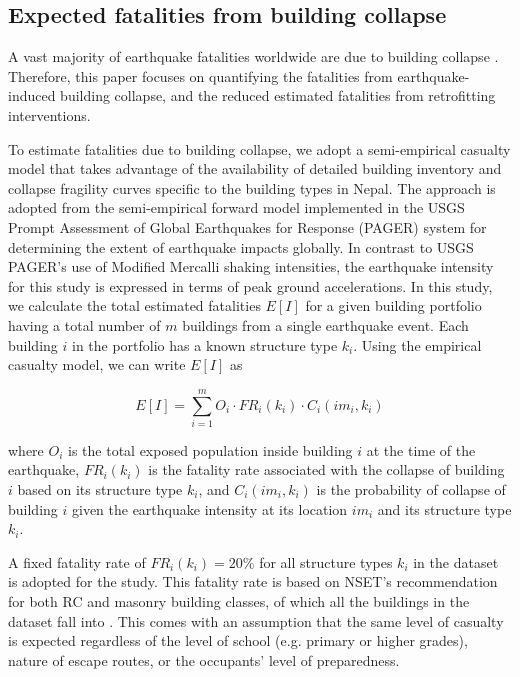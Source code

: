 \documentclass[utf8]{frontiersSCNS} %
\begin{document}
\vspace{0.5cm} %

\subsection{Expected fatalities from building collapse}

A vast majority of earthquake fatalities worldwide are due to building collapse \citep{spence2007saving}. Therefore, this paper focuses on quantifying the fatalities from earthquake-induced building collapse, and the reduced estimated fatalities from retrofitting interventions.

To estimate fatalities due to building collapse, we adopt a semi-empirical casualty model that takes advantage of the availability of detailed building inventory and collapse fragility curves specific to the building types in Nepal. The approach is adopted from the semi-empirical forward model implemented in the USGS Prompt Assessment of Global Earthquakes for Response (PAGER) system \citep{jaiswal2011earthquake} for determining the extent of earthquake impacts globally. In contrast to USGS PAGER's use of Modified Mercalli shaking intensities, the earthquake intensity for this study is expressed in terms of peak ground accelerations. In this study, we calculate the total estimated fatalities $E[I]$ for a given building portfolio having a total number of $m$ buildings from a single earthquake event. Each building $i$ in the portfolio has a known structure type $k_{i}$. Using the empirical casualty model, we can write $E[I]$ as

    \begin{equation}\label{eq:loss_fat}
    E[I] = \sum_{i=1}^{m} O_{i} \cdot FR_{i}(k_{i}) \cdot C_{i}(im_{i}, k_{i})
    \end{equation} 

where $O_{i}$ is the total exposed population inside building $i$ at the time of the earthquake, $FR_{i}(k_{i})$ is the fatality rate associated with the collapse of building $i$ based on its structure type $k_{i}$, and $C_{i}(im_{i}, k_{i})$ is the probability of collapse of building $i$ given the earthquake intensity at its location $im_{i}$ and its structure type $k_{i}$.

A fixed fatality rate of $FR_{i}(k_{i}) = 20\%$ for all structure types $k_{i}$ in the dataset is adopted for the study. This fatality rate is based on NSET's recommendation for both RC and masonry building classes, of which all the buildings in the dataset fall into \citep{nset2000}. This comes with an assumption that the same level of casualty is expected regardless of the level of school (e.g. primary or higher grades), nature of escape routes, or the occupants' level of preparedness.
\end{document}
